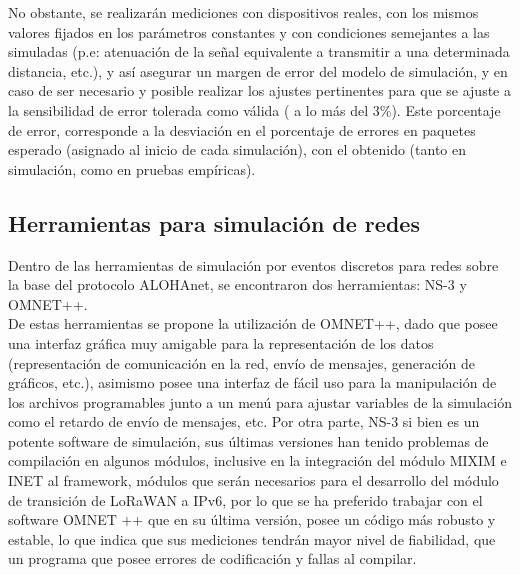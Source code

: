 \begin{justify}
\begin{itemize}
\end{itemize}
No obstante, se realizarán mediciones con dispositivos reales, con los mismos valores fijados en los parámetros constantes y con condiciones semejantes a las simuladas (p.e: atenuación de la señal equivalente a transmitir a una determinada distancia, etc.), y así asegurar un margen de error del modelo de simulación, y en caso de ser necesario y posible  realizar los ajustes pertinentes para que se ajuste a la sensibilidad de error tolerada como válida ( a lo más del 3\%). Este porcentaje de error, corresponde a la desviación en el porcentaje de errores en paquetes esperado (asignado al inicio de cada simulación), con el obtenido (tanto en simulación, como en pruebas empíricas).

\subsection{Herramientas para simulación de redes}
Dentro de las herramientas de simulación por eventos discretos para redes sobre la base del protocolo ALOHAnet, se encontraron dos herramientas: NS-3 y OMNET++.\\
De estas herramientas se propone la utilización de OMNET++, dado que posee una interfaz gráfica muy amigable para la representación de los datos (representación de comunicación en la red, envío de mensajes, generación de gráficos, etc.), asimismo posee una interfaz de fácil uso para la manipulación de los archivos programables junto a un menú para ajustar variables de la simulación como el retardo de envío de mensajes, etc. Por otra parte, NS-3 si bien es un potente software de simulación, sus últimas versiones han tenido problemas de compilación en algunos módulos, inclusive en la integración del módulo MIXIM e INET al framework, módulos que serán necesarios para el desarrollo del módulo de transición de LoRaWAN a IPv6, por lo que se ha preferido trabajar con el software OMNET ++ que en su última versión, posee un código más robusto y estable, lo que indica que sus mediciones tendrán mayor nivel de fiabilidad, que un programa que posee errores de codificación y fallas al compilar.

\end{justify}
